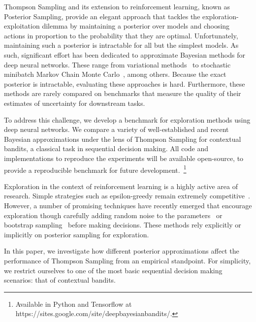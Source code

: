 \documentclass{article} \usepackage{iclr2018_conference,times}
\begin{document}
Thompson Sampling \citep{thompson1933likelihood} and its extension to reinforcement learning, known as Posterior Sampling, provide an elegant approach that tackles the exploration-exploitation dilemma by maintaining a posterior over models and choosing actions in proportion to the probability that they are optimal. Unfortunately, maintaining such a posterior is intractable for all but the simplest models.
As such, significant effort has been dedicated to approximate Bayesian methods for deep neural networks.  These range from variational methods~\citep{graves2011practical,blundell2015weight,kingma2015variational} to stochastic minibatch Markov Chain Monte Carlo~\citep{Neal1994,WellingTeh2011,Li2016,Ahn2013,Mandt2016}, among others.  Because the exact posterior is intractable, evaluating these approaches is hard. Furthermore, these methods are rarely compared on benchmarks that measure the quality of their estimates of uncertainty for downstream tasks.  

To address this challenge, we develop a benchmark for exploration methods using deep neural networks.  We compare a variety of well-established and recent Bayesian approximations under the lens of Thompson Sampling for contextual bandits, a classical task in sequential decision making. All code and implementations to reproduce the experiments will be available open-source, to provide a reproducible benchmark for future development.~\footnote{Available in Python and Tensorflow at https://sites.google.com/site/deepbayesianbandits/.}



Exploration in the context of reinforcement learning is a highly active area of research. Simple strategies such as epsilon-greedy remain extremely competitive~\citep{mnih2015,Schaul2016}.  However, a number of promising techniques have recently emerged that encourage exploration though carefully adding random noise to the parameters~\citep{Plappert17, Fortunato2017, gal2016dropout} or bootstrap sampling~\citep{osband2016deep} before making decisions.  These methods rely explicitly or implicitly on posterior sampling for exploration. 







In this paper, we investigate how different posterior approximations affect the performance of Thompson Sampling from an empirical standpoint.
For simplicity, we restrict ourselves to one of the most basic sequential decision making scenarios: that of contextual bandits.
\end{document}
